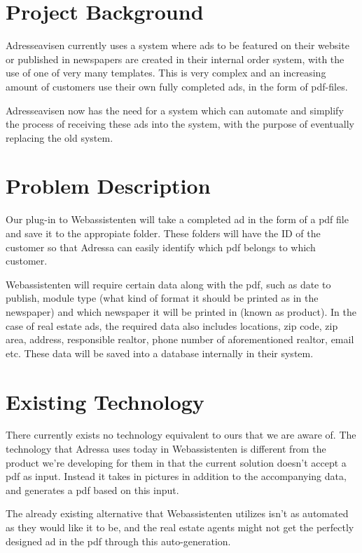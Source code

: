 \section{Project Background}
Adresseavisen currently uses a system where ads to be featured on their website or published in newspapers are created in their internal order system, with the use of one of very many templates. This is very complex and an increasing amount of customers use their own fully completed ads, in the form of pdf-files.

Adresseavisen now has the need for a system which can automate and simplify the process of receiving these ads into the system, with the purpose of eventually replacing the old system.

\section{Problem Description}
Our plug-in to Webassistenten will take a completed ad in the form of a pdf file and save it to the appropiate folder. These folders will have the ID of the customer so that Adressa can easily identify which pdf belongs to which customer.

Webassistenten will require certain data along with the pdf, such as date to publish, module type (what kind of format it should be printed as in the newspaper) and which newspaper it will be printed in (known as product). In the case of real estate ads, the required data also includes locations, zip code, zip area, address, responsible realtor, phone number of aforementioned realtor, email etc. These data will be saved into a database internally in their system. 

\section{Existing Technology}
There currently exists no technology equivalent to ours that we are aware of. The technology that Adressa uses today in Webassistenten is different from the product we're developing for them in that the current solution doesn't accept a pdf as input. Instead it takes in pictures in addition to the accompanying data, and generates a pdf based on this input.

The already existing alternative that Webassistenten utilizes isn't as automated as they would like it to be, and the real estate agents might not get the perfectly designed ad in the pdf through this auto-generation.

